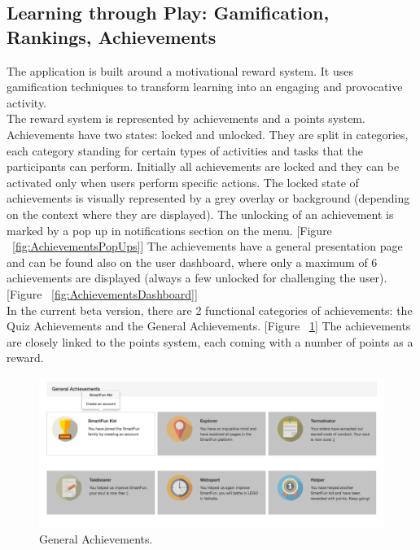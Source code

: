 \subsection{Learning through Play: Gamification, Rankings, Achievements}


The application is built around a motivational reward system. It uses gamification techniques to transform learning into an engaging and provocative activity. \\


The reward system is represented by achievements and a points system. Achievements have two states: locked and unlocked. They are split in categories, each category standing for certain types of activities and tasks that the participants can perform. Initially all achievements are locked and they can be activated only when users perform specific actions. The locked state of achievements is visually represented by a grey overlay or background (depending on the context where they are displayed). The unlocking of an achievement is marked by a pop up in notifications section on the menu. [Figure ~\ref{fig:AchievementsPopUps}] The achievements have a general presentation page and can be found also on the user dashboard, where only a maximum of 6 achievements are displayed (always a few unlocked for challenging the user). [Figure ~\ref{fig:AchievementsDashboard}] \\

In the current beta version, there are 2 functional categories of achievements: the Quiz Achievements and the General Achievements. [Figure ~\ref{fig:GeneralAchievements}] The achievements are closely linked to the points system, each coming with a number of points as a reward.\\

\begin{figure}
\includegraphics[width=1\linewidth]{images/ui/GeneralAchievements.png}
\caption{General Achievements.}
\label{fig:GeneralAchievements}
\end{figure}

